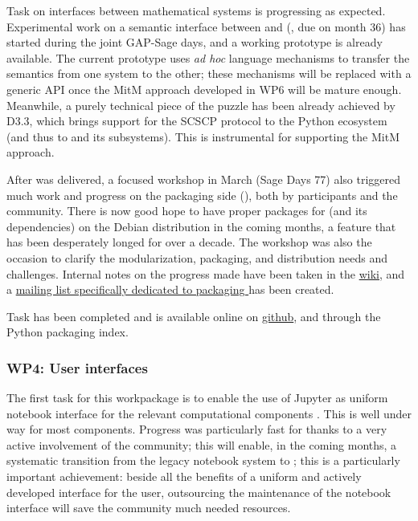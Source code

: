 \documentclass{deliverablereport}
\begin{document}
Task  on interfaces
between mathematical systems is progressing as expected. Experimental
work on a semantic interface between \GAP and \Sage
(, due
on month 36) has started during the joint GAP-Sage days, and a working
prototype is already available. The current prototype uses \emph{ad
  hoc} language mechanisms to transfer the semantics from one system
to the other; these mechanisms will be replaced with a generic API
once the MitM approach developed in WP6 will be mature
enough. Meanwhile, a purely technical piece of the puzzle has been
already achieved by D3.3, which brings support for the SCSCP protocol
to the Python ecosystem (and thus to \Sage and its subsystems). This
is instrumental for supporting the MitM approach.

After  was delivered, a focused workshop
 in March (Sage Days 77) also triggered much work
and progress on the packaging side
(), both by \ODK
participants and the community. There is now good hope to have proper
packages for \Sage (and its dependencies) on the Debian
distribution in the coming months, a feature that has been desperately
longed for over a decade.  The workshop was also the occasion to
clarify the modularization, packaging, and distribution needs and
challenges. Internal notes on the progress made have been taken in the
\href{https://wiki.sagemath.org/days77/packaging}{\Sage wiki}, and a
\href{https://groups.google.com/forum/#!forum/sage-packaging}{mailing
  list specifically dedicated to packaging \Sage} has been created.

Task  has
been completed and is available online on
\href{https://github.com/joommf/oommfc}{github}, and through the
Python packaging index.

\subsubsection{WP4: User interfaces}

The first task for this workpackage is to enable the use of Jupyter as
uniform notebook interface for the relevant computational components
. This is well under way for most
components. Progress was particularly fast for \Sage thanks to a
very active involvement of the community; this will enable, in the
coming months, a systematic transition from the legacy \Sage
notebook system to \Jupyter; this is a particularly important
achievement: beside all the benefits of a uniform and actively
developed interface for the user, outsourcing the maintenance of the
notebook interface will save the \Sage community much needed
resources.
\end{document}
